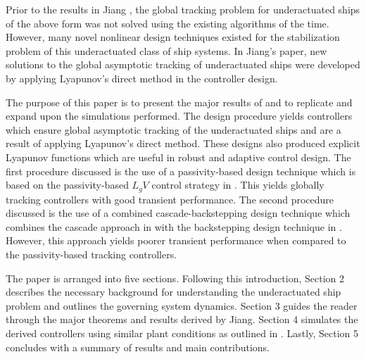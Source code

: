 \documentclass[amsthm, twocolumn]{autart}
\begin{document}
Prior to the results in Jiang \cite{Jiang02}, the global tracking problem for underactuated ships of the above form was not solved using the existing algorithms of the time. However, many novel nonlinear design techniques existed for the stabilization problem of this underactuated class of ship systems. In Jiang's paper, new solutions to the global asymptotic tracking of underactuated ships were developed by applying Lyapunov's direct method in the controller design.

The purpose of this paper is to present the major results of \cite{Jiang02} and to replicate and expand upon the simulations performed. The design procedure yields controllers which ensure global asymptotic tracking of the underactuated ships and are a result of applying Lyapunov's direct method. These designs also produced explicit Lyapunov functions which are useful in robust and adaptive control design. The first procedure discussed is the use of a passivity-based design technique which is based on the passivity-based $L_gV$ control strategy in \cite{JuQu79}. This yields globally tracking controllers with good transient performance. The second procedure discussed is the use of a combined cascade-backstepping design technique which combines the cascade approach in \cite{Lefe00} with the backstepping design technique in \cite{JiNi99,Jiang00a}. However, this approach yields poorer transient performance when compared to the passivity-based tracking controllers.

The paper is arranged into five sections. Following this introduction, Section 2 describes the necessary background for understanding the underactuated ship problem and outlines the governing system dynamics. Section 3 guides the reader through the major theorems and results derived by Jiang. Section 4 simulates the derived controllers using similar plant conditions as outlined in \cite{Jiang02}. Lastly, Section 5 concludes with a summary of results and main contributions.

\end{document}

